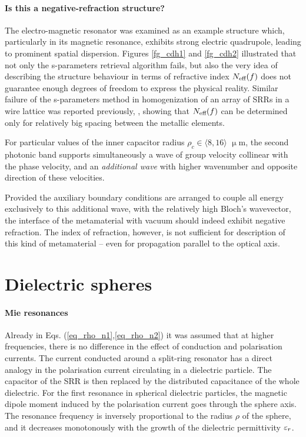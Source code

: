 \paragraph{Is this a negative-refraction structure?}%
The electro-magnetic resonator was examined as an example structure which, particularly in its magnetic resonance, exhibits strong electric quadrupole, leading to prominent spatial dispersion. Figures \ref{fg_cdh1} and \ref{fg_cdh2} illustrated that not only the s-parameters retrieval algorithm fails, but also the very idea of describing the structure behaviour in terms of refractive index $N_{\text{eff} }(f)$ does not guarantee enough degrees of freedom to express the physical reality.
Similar failure of the s-parameters method in homogenization of an array of SRRs in a wire lattice was reported previously, \cite{rockstuhl2008transition}, showing that $N_{\text{eff} }(f)$ can be determined only for relatively big spacing between the metallic  elements.

For particular values of the inner capacitor radius $\rho_c \in \langle8,16\rangle$ $\upmu$m, the second photonic band supports simultaneously a wave of group velocity collinear with the phase velocity, and an \textit{additional wave} with higher wavenumber and opposite direction of these velocities. 

Provided the auxiliary boundary conditions are arranged to couple all energy exclusively to this additional wave, with the relatively high Bloch's wavevector, the interface of the metamaterial with vacuum should indeed exhibit negative refraction. The index of refraction, however, is not sufficient for description of this kind of metamaterial -- even for propagation parallel to the optical axis.

\FloatBarrier %
\section{Dielectric spheres} %
\paragraph{Mie resonances}%
Already in Eqs. (\ref{eq_rho_n1},\ref{eq_rho_n2}) it was assumed that at higher frequencies, there is no difference in the effect of conduction and polarisation currents. The current conducted around a split-ring resonator has a direct analogy in the polarisation current circulating in a dielectric particle. The capacitor of the SRR is then replaced by the distributed capacitance of the whole dielectric. For the first resonance in spherical dielectric particles, the magnetic dipole moment induced by the polarisation current goes through the sphere axis. The resonance frequency is inversely proportional to the radius $\rho$ of the sphere, and it decreases monotonously with the growth of the dielectric permittivity $\varepsilon_r$.

